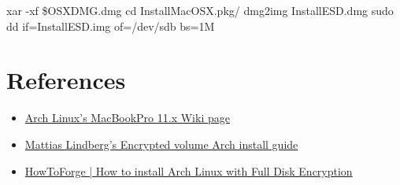 xar -xf \$OSXDMG.dmg
cd InstallMacOSX.pkg/
dmg2img InstallESD.dmg
sudo dd if=InstallESD.img of=/dev/sdb bs=1M


\clearpage
\section{References}

\begin{itemize}
	\item \href{https://wiki.archlinux.org/index.php/MacBookPro11,x#Using_the_MacBook.27s_native_EFI_bootloader_.28recommended.29}{Arch Linux's MacBookPro 11.x Wiki page}
	\item \href{https://gist.github.com/mattiaslundberg/8620837}{Mattias Lindberg's Encrypted volume Arch install guide}
	\item \href{https://www.howtoforge.com/tutorial/how-to-install-arch-linux-with-full-disk-encryption/}{HowToForge | How to install Arch Linux with Full Disk Encryption}
\end{itemize}


